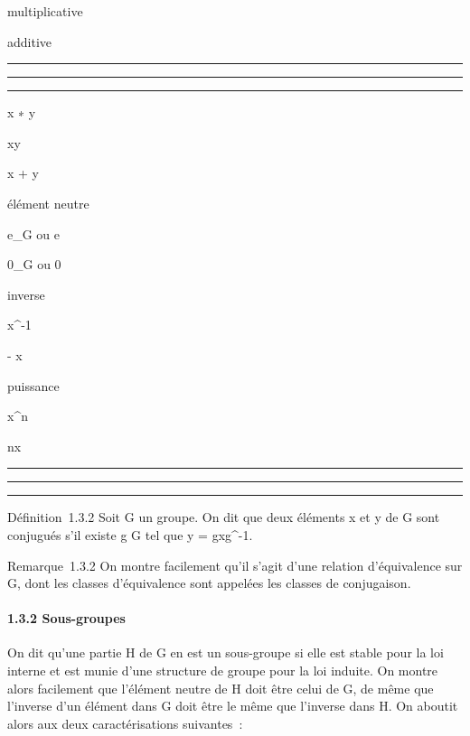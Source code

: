 multiplicative

additive

\begin{center}\rule{3in}{0.4pt}\end{center}

\begin{center}\rule{3in}{0.4pt}\end{center}

\begin{center}\rule{3in}{0.4pt}\end{center}

x ∗ y

xy

x + y

élément neutre

e_G ou e

0_G ou 0

inverse

x^-1

- x

puissance

x^n

nx

\begin{center}\rule{3in}{0.4pt}\end{center}

\begin{center}\rule{3in}{0.4pt}\end{center}

\begin{center}\rule{3in}{0.4pt}\end{center}

Définition~1.3.2 Soit G un groupe. On dit que deux éléments x et y de G
sont conjugués s'il existe g \in G tel que y = gxg^-1.

Remarque~1.3.2 On montre facilement qu'il s'agit d'une relation
d'équivalence sur G, dont les classes d'équivalence sont appelées les
classes de conjugaison.

\paragraph{1.3.2 Sous-groupes}

On dit qu'une partie H de G en est un sous-groupe si elle est stable
pour la loi interne et est munie d'une structure de groupe pour la loi
induite. On montre alors facilement que l'élément neutre de H doit être
celui de G, de même que l'inverse d'un élément dans G doit être le même
que l'inverse dans H. On aboutit alors aux deux caractérisations
suivantes~:

